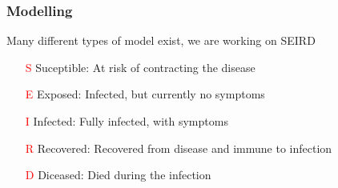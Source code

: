 \documentclass{beamer}
\begin{document}
\begin{frame}
	\frametitle{Modelling}
		Many different types of model exist, we are working on SEIRD\newline
	\begin{enumerate}
		\item[\textcolor{red}{S}] Suceptible: At risk of contracting the disease
		\item[\textcolor{red}{E}] Exposed: Infected, but currently no symptoms
		\item[\textcolor{red}{I}] Infected: Fully infected, with symptoms
		\item[\textcolor{red}{R}] Recovered: Recovered from disease and immune to infection
		\item[\textcolor{red}{D}] Diceased: Died during the infection
	\end{enumerate}
	\vspace{0.1cm}

\end{frame}
\end{document}
